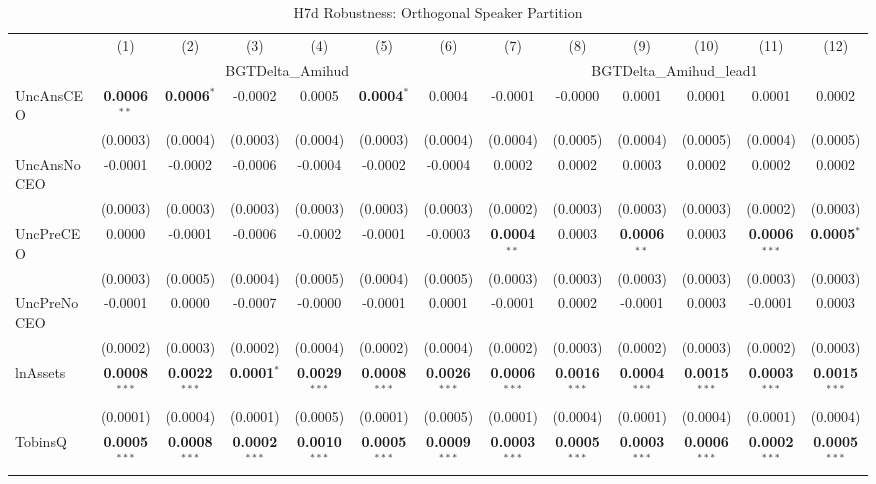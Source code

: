 \documentclass[11pt,a4paper]{article}
\begin{document}
\begin{table}[htbp]
\centering
\caption{H7d Robustness: Orthogonal Speaker Partition}
\label{tab:h7d_robust}
\scriptsize
\begin{tabular}{lcccccccccccc}
\toprule
 & (1) & (2) & (3) & (4) & (5) & (6) & (7) & (8) & (9) & (10) & (11) & (12) \\
 & \multicolumn{6}{c}{BGTDelta\_Amihud} & \multicolumn{6}{c}{BGTDelta\_Amihud\_lead1} \\
\cmidrule(lr){2-7} \cmidrule(lr){8-13}
\midrule
UncAnsCEO & \textbf{0.0006}$^{**}$ & \textbf{0.0006}$^{*}$ & -0.0002 & 0.0005 & \textbf{0.0004}$^{*}$ & 0.0004 & -0.0001 & -0.0000 & 0.0001 & 0.0001 & 0.0001 & 0.0002 \\
 & (0.0003) & (0.0004) & (0.0003) & (0.0004) & (0.0003) & (0.0004) & (0.0004) & (0.0005) & (0.0004) & (0.0005) & (0.0004) & (0.0005) \\
UncAnsNoCEO & -0.0001 & -0.0002 & -0.0006 & -0.0004 & -0.0002 & -0.0004 & 0.0002 & 0.0002 & 0.0003 & 0.0002 & 0.0002 & 0.0002 \\
 & (0.0003) & (0.0003) & (0.0003) & (0.0003) & (0.0003) & (0.0003) & (0.0002) & (0.0003) & (0.0003) & (0.0003) & (0.0002) & (0.0003) \\
UncPreCEO & 0.0000 & -0.0001 & -0.0006 & -0.0002 & -0.0001 & -0.0003 & \textbf{0.0004}$^{**}$ & 0.0003 & \textbf{0.0006}$^{**}$ & 0.0003 & \textbf{0.0006}$^{***}$ & \textbf{0.0005}$^{*}$ \\
 & (0.0003) & (0.0005) & (0.0004) & (0.0005) & (0.0004) & (0.0005) & (0.0003) & (0.0003) & (0.0003) & (0.0003) & (0.0003) & (0.0003) \\
UncPreNoCEO & -0.0001 & 0.0000 & -0.0007 & -0.0000 & -0.0001 & 0.0001 & -0.0001 & 0.0002 & -0.0001 & 0.0003 & -0.0001 & 0.0003 \\
 & (0.0002) & (0.0003) & (0.0002) & (0.0004) & (0.0002) & (0.0004) & (0.0002) & (0.0003) & (0.0002) & (0.0003) & (0.0002) & (0.0003) \\
\midrule
lnAssets & \textbf{0.0008}$^{***}$ & \textbf{0.0022}$^{***}$ & \textbf{0.0001}$^{*}$ & \textbf{0.0029}$^{***}$ & \textbf{0.0008}$^{***}$ & \textbf{0.0026}$^{***}$ & \textbf{0.0006}$^{***}$ & \textbf{0.0016}$^{***}$ & \textbf{0.0004}$^{***}$ & \textbf{0.0015}$^{***}$ & \textbf{0.0003}$^{***}$ & \textbf{0.0015}$^{***}$ \\
 & (0.0001) & (0.0004) & (0.0001) & (0.0005) & (0.0001) & (0.0005) & (0.0001) & (0.0004) & (0.0001) & (0.0004) & (0.0001) & (0.0004) \\
TobinsQ & \textbf{0.0005}$^{***}$ & \textbf{0.0008}$^{***}$ & \textbf{0.0002}$^{***}$ & \textbf{0.0010}$^{***}$ & \textbf{0.0005}$^{***}$ & \textbf{0.0009}$^{***}$ & \textbf{0.0003}$^{***}$ & \textbf{0.0005}$^{***}$ & \textbf{0.0003}$^{***}$ & \textbf{0.0006}$^{***}$ & \textbf{0.0002}$^{***}$ & \textbf{0.0005}$^{***}$ \\

\end{tabular}
\end{table}
\end{document}

